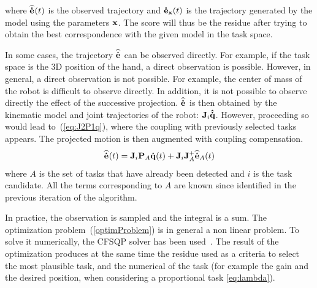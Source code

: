 \documentclass[journal]{IEEEtran}
\begin{document}
\noindent where ${\mathbf{\widehat{\dot{e}}}}_{}(t)$ is the observed trajectory and ${\mathbf{\dot{e}}}_{{\mathbf{x}}}(t)$ is the trajectory
generated by the model using the parameters ${\mathbf{x}}$.
The score will thus be the residue after trying to obtain the best correspondence with the given
model in the task space.

In some cases, the trajectory ${\mathbf{\widehat{\dot{e}}}}_{}$ can be observed directly. For example, if the task space 
is the 3D position of the hand, a direct observation is possible.
However, in general, a direct observation is not possible. For example,
the center of mass of the robot is difficult to observe directly. 
In addition, it is not possible to observe directly the effect of the successive projection. 
${\mathbf{\widehat{\dot{e}}}}_{}$ is then obtained by the kinematic model and 
joint trajectories of the robot: ${\mathbf{J}}_i{\mathbf{\hat{\dot{q}}}}$.
However, proceeding so would lead to~(\ref{eq:J2P1q}), where the coupling with previously
selected tasks appears. The projected motion is then augmented with coupling compensation.
\begin{equation}
  \medoth{}(t) = \mbf{J}_i\mbf{P}_A \mbf{\dot{q}}(t) + \mbf{J}_i\mbf{J}_A^+\medoth{A}(t)
  \label{eq:compensation}
\end{equation}
where $A$ is the set of tasks that have already been detected and $i$ is the task candidate.
All the terms corresponding to $A$ are known since identified in the previous
iteration of the algorithm.


\medskip
In practice, the observation is sampled and the integral is a sum.
The optimization problem~(\ref{optimProblem}) is in general a non linear problem. To solve
it numerically, the CFSQP solver has been used~\cite{lawrence97}. The result of the optimization produces at the same time the residue used as a criteria to select the most plausible task, and the numerical of the task (for example the gain and the desired position, when considering a proportional task \eqref{eq:lambda}).
\end{document}
